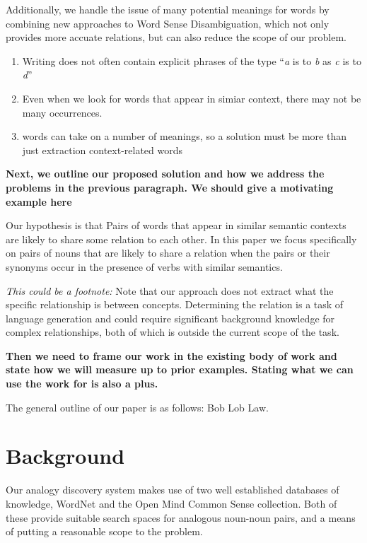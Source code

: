 \documentclass[11pt]{article}
\begin{document}
Additionally, we handle the issue of many potential meanings for words by
combining new approaches to Word Sense Disambiguation, which not only provides
more accuate relations, but can also reduce the scope of our problem. 
\begin{enumerate}
  \item Writing does not often contain explicit phrases of the type ``\emph{a}
    is to \emph{b} as \emph{c} is to \emph{d}''
  \item Even when we look for words that appear in simiar context, there  may
    not be many occurrences.
  \item words can take on a number of meanings, so a solution must be more than
    just extraction context-related words
\end{enumerate}

{\bf Next, we outline our proposed solution and how we address the problems in
  the previous paragraph.  We should give a motivating example here}  

Our hypothesis is that Pairs of words that appear in similar semantic contexts
are likely to share some relation to each other.  In this paper we focus
specifically on pairs of nouns that are likely to share a relation when the
pairs or their synonyms occur in the presence of verbs with similar semantics.  

\emph{This could be a footnote:} Note that our approach does not extract what the
specific relationship is between concepts.  Determining the relation is a task
of language generation and could require significant background knowledge for
complex relationships, both of which is outside the current scope of the task.

{\bf Then we need to frame our work in the existing body of work and state how
  we will measure up to prior examples.  Stating what we can use the work for is
  also a plus.}

The general outline of our paper is as follows: Bob Lob Law.

\section{Background}
\label{sec:background}

Our analogy discovery system makes use of two well established databases of
knowledge, WordNet \cite{fellbaum98wordnet} and the Open Mind Common Sense
\cite{havasi07conceptnet} collection.  Both of these provide suitable search
spaces for analogous noun-noun pairs, and a means of putting a reasonable scope
to the problem.
\end{document}

